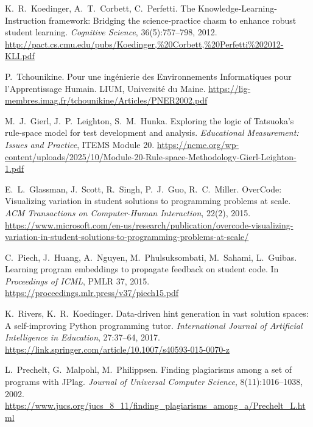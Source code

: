  K.~R.~Koedinger, A.~T.~Corbett, C.~Perfetti. \newblock The Knowledge-Learning-Instruction framework: Bridging the science-practice chasm to enhance robust student learning. \newblock \emph{Cognitive Science}, 36(5):757--798, 2012. \newblock \url{http://pact.cs.cmu.edu/pubs/Koedinger,%20Corbett,%20Perfetti%202012-KLI.pdf}

 P.~Tchounikine. \newblock Pour une ingénierie des Environnements Informatiques pour l'Apprentissage Humain. \newblock LIUM, Université du Maine. \newblock \url{https://lig-membres.imag.fr/tchounikine/Articles/PNER2002.pdf}

 M.~J.~Gierl, J.~P.~Leighton, S.~M.~Hunka. \newblock Exploring the logic of Tatsuoka's rule-space model for test development and analysis. \newblock \emph{Educational Measurement: Issues and Practice}, ITEMS Module 20. \newblock \url{https://ncme.org/wp-content/uploads/2025/10/Module-20-Rule-space-Methodology-Gierl-Leighton-1.pdf}

 E.~L.~Glassman, J.~Scott, R.~Singh, P.~J.~Guo, R.~C.~Miller. \newblock OverCode: Visualizing variation in student solutions to programming problems at scale. \newblock \emph{ACM Transactions on Computer-Human Interaction}, 22(2), 2015. \newblock \url{https://www.microsoft.com/en-us/research/publication/overcode-visualizing-variation-in-student-solutions-to-programming-problems-at-scale/}

 C.~Piech, J.~Huang, A.~Nguyen, M.~Phulsuksombati, M.~Sahami, L.~Guibas. \newblock Learning program embeddings to propagate feedback on student code. \newblock In \emph{Proceedings of ICML}, PMLR 37, 2015. \newblock \url{https://proceedings.mlr.press/v37/piech15.pdf}

 K.~Rivers, K.~R.~Koedinger. \newblock Data-driven hint generation in vast solution spaces: A self-improving Python programming tutor. \newblock \emph{International Journal of Artificial Intelligence in Education}, 27:37--64, 2017. \newblock \url{https://link.springer.com/article/10.1007/s40593-015-0070-z}

 L.~Prechelt, G.~Malpohl, M.~Philippsen. \newblock Finding plagiarisms among a set of programs with JPlag. \newblock \emph{Journal of Universal Computer Science}, 8(11):1016--1038, 2002. \newblock \url{https://www.jucs.org/jucs_8_11/finding_plagiarisms_among_a/Prechelt_L.html}

